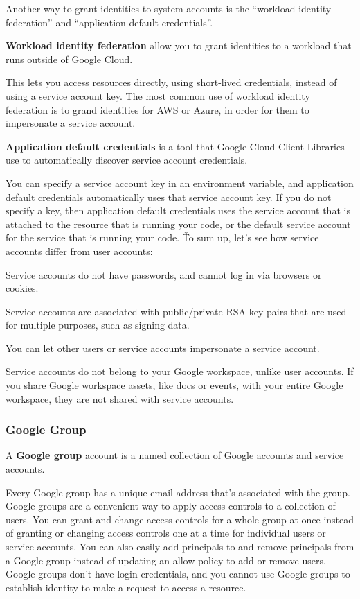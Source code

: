 Another way to grant identities to system accounts is the ``workload identity federation'' and ``application default
credentials''.

\textbf{Workload identity federation} allow you to grant identities to a workload that runs outside of Google Cloud.
\ed

This lets you access resources directly, using short-lived credentials, instead of using a service account key. The
most common use of workload identity federation is to grand identities for AWS or Azure, in order for them to
impersonate a service account.

\textbf{Application default credentials} is a tool that Google Cloud Client Libraries use to automatically discover
service account credentials.
\ed

You can specify a service account key in an environment variable, and application default credentials automatically
uses that service account key. If you do not specify a key, then application default credentials uses the service
account that is attached to the resource that is running your code, or the default service account for the service
that is running your code. \v

To sum up, let's see how service accounts differ from user accounts:
\bit
\item Service accounts do not have passwords, and cannot log in via browsers or cookies.
\item Service accounts are associated with public/private RSA key pairs that are used for multiple purposes, such as
signing data.
\item You can let other users or service accounts impersonate a service account.
\item Service accounts do not belong to your Google workspace, unlike user accounts. If you share Google workspace
assets, like docs or events, with your entire Google workspace, they are not shared with service accounts.
\eit

\subsubsection*{Google Group}

A \textbf{Google group} account is a named collection of Google accounts and service accounts.
\ed

Every Google group has a unique email address that's associated with the group. Google groups are a convenient way to
apply access controls to a collection of users. You can grant and change access controls for a whole group at once
instead of granting or changing access controls one at a time for individual users or service accounts. You can also
easily add principals to and remove principals from a Google group instead of updating an allow policy to add or
remove users. Google groups don't have login credentials, and you cannot use Google groups to establish identity to
make a request to access a resource.

